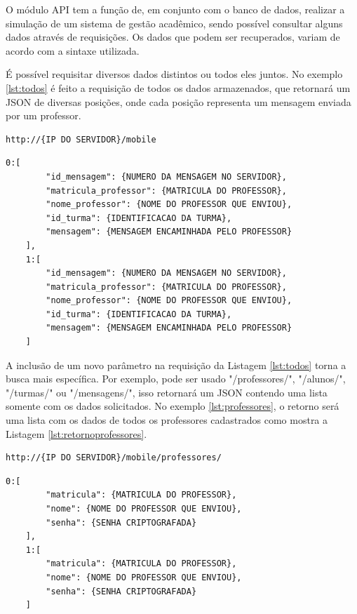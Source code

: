 O módulo API tem a função de, em conjunto com o banco de dados, realizar a simulação de um sistema de gestão acadêmico, sendo possível consultar alguns dados através de requisições. Os dados que podem ser recuperados, variam de acordo com a sintaxe utilizada.

É possível requisitar diversos dados distintos ou todos eles juntos. 
No exemplo \ref{lst:todos} é feito a requisição de todos os dados armazenados, que retornará um JSON de diversas posições, onde cada posição representa um mensagem enviada por um professor.
\begin{lstlisting}[caption={Requisitar todos os dados},label={lst:todos}]
	http://{IP DO SERVIDOR}/mobile
\end{lstlisting}

\begin{lstlisting}[caption={Retorno da requisição \ref{lst:todos}},label={lst:retornotodos}]
	0:[
		"id_mensagem": {NUMERO DA MENSAGEM NO SERVIDOR},
		"matricula_professor": {MATRICULA DO PROFESSOR},
		"nome_professor": {NOME DO PROFESSOR QUE ENVIOU},
		"id_turma": {IDENTIFICACAO DA TURMA},
		"mensagem": {MENSAGEM ENCAMINHADA PELO PROFESSOR}
	],
	1:[		
		"id_mensagem": {NUMERO DA MENSAGEM NO SERVIDOR},
		"matricula_professor": {MATRICULA DO PROFESSOR},
		"nome_professor": {NOME DO PROFESSOR QUE ENVIOU},
		"id_turma": {IDENTIFICACAO DA TURMA},
		"mensagem": {MENSAGEM ENCAMINHADA PELO PROFESSOR}
	]
\end{lstlisting}

A inclusão de um novo parâmetro na requisição da Listagem \ref{lst:todos} torna a busca mais específica. Por exemplo, pode ser usado "/professores/", "/alunos/", "/turmas/" ou "/mensagens/", isso retornará um JSON contendo uma lista somente com os dados solicitados. No exemplo \ref{lst:professores}, o retorno será uma lista com os dados de todos os professores cadastrados como mostra a Listagem \ref{lst:retornoprofessores}.

\begin{lstlisting}[caption={Requisitar lista de dados especifica},label={lst:professores}]
	http://{IP DO SERVIDOR}/mobile/professores/
\end{lstlisting}

\begin{lstlisting}[caption={Retorno da requisição \ref{lst:bd}},label={lst:retornoprofessores}]
	0:[
		"matricula": {MATRICULA DO PROFESSOR},
		"nome": {NOME DO PROFESSOR QUE ENVIOU},
		"senha": {SENHA CRIPTOGRAFADA}
	],
	1:[		
		"matricula": {MATRICULA DO PROFESSOR},
		"nome": {NOME DO PROFESSOR QUE ENVIOU},
		"senha": {SENHA CRIPTOGRAFADA}
	]
\end{lstlisting}

